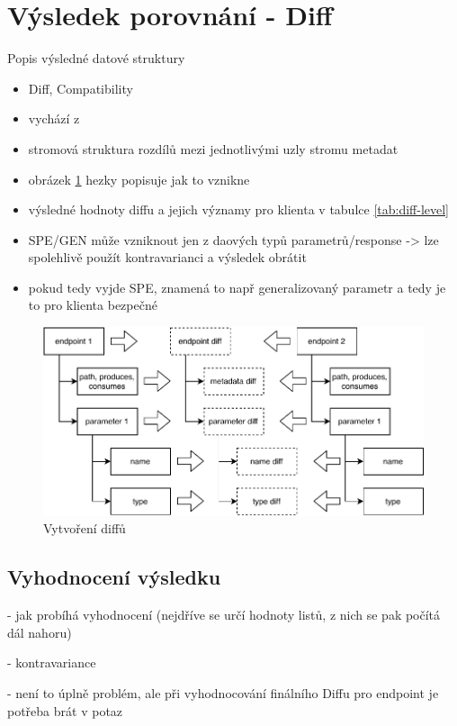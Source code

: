 \documentclass[czech,DP]{thesiskiv}
\begin{document}
\section{Výsledek porovnání - Diff}	
Popis výsledné datové struktury
\begin{itemize}
	\item Diff, Compatibility
	\item vychází z \cite{brada2006diff}
	\item stromová struktura rozdílů mezi jednotlivými uzly stromu metadat
	\item obrázek \ref{fig:diff-construction} hezky popisuje jak to vznikne
	\item výsledné hodnoty diffu a jejich významy pro klienta v tabulce \ref{tab:diff-level}
	\item SPE/GEN může vzniknout jen z daových typů parametrů/response -> lze spolehlivě použít kontravarianci a výsledek obrátit
	\item pokud tedy vyjde SPE, znamená to např generalizovaný parametr a tedy je to pro klienta bezpečné
\end{itemize}
	
\begin{figure}[h]
	\centering
	\includegraphics{diff-construction}
	\caption{Vytvoření diffů}
	\label{fig:diff-construction}
\end{figure}

\subsection{Vyhodnocení výsledku}

- jak probíhá vyhodnocení (nejdříve se určí hodnoty listů, z nich se pak počítá dál nahoru)

- kontravariance

	- není to úplně problém, ale při vyhodnocování finálního Diffu pro endpoint je potřeba brát v potaz 
	
\end{document}
